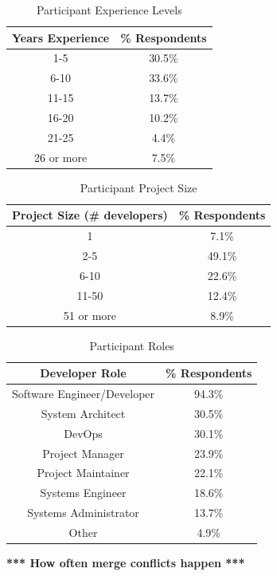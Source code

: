 \documentclass[conference]{IEEEtran}
\begin{document}
\begin{table}[!t]
\renewcommand{\arraystretch}{1.3}
\caption{Participant Experience Levels}
\label{exp_levels}
\centering
\begin{tabular}{|c||c|}
\hline
Years Experience & \% Respondents\\
\hline
1-5 & 30.5\%\\
6-10 & 33.6\%\\
11-15 & 13.7\%\\
16-20 & 10.2\%\\
21-25 & 4.4\%\\
26 or more & 7.5\%\\
\hline
\end{tabular}
\end{table}

\begin{table}[!t]
\renewcommand{\arraystretch}{1.3}
\caption{Participant Project Size}
\label{project_size}
\centering
\begin{tabular}{|c||c|}
\hline
Project Size (\# developers) & \% Respondents\\
\hline
1 & 7.1\%\\
2-5 & 49.1\%\\
6-10 & 22.6\%\\
11-50 & 12.4\%\\
51 or more & 8.9\%\\
\hline
\end{tabular}
\end{table}

\begin{table}[!t]
\renewcommand{\arraystretch}{1.3}
\caption{Participant Roles}
\label{roles_table}
\centering
\begin{tabular}{|c||c|}
\hline
Developer Role & \% Respondents\\
\hline
Software Engineer/Developer & 94.3\%\\
System Architect & 30.5\%\\
DevOps & 30.1\%\\
Project Manager & 23.9\%\\
Project Maintainer & 22.1\%\\
Systems Engineer & 18.6\%\\
Systems Administrator & 13.7\%\\
Other & 4.9\%\\
\hline
\end{tabular}
\end{table}


\textbf{*** How often merge conflicts happen ***}
\end{document}
